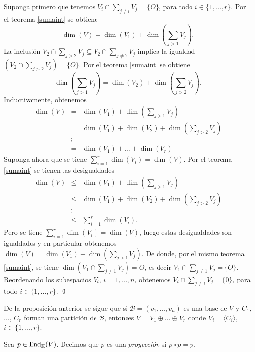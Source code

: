 \dem Suponga primero que tenemos $V_i\cap\sum_{j\ne i} V_j=\{O\}$, para todo $i\in\{1,\ldots,r\}$. Por el teorema \ref{sumaint} se obtiene
$$\dim(V)=\dim(V_1)+\dim\left(\sum_{j>1} V_j\right).$$
La inclusi\'on $V_2\cap\sum_{j>2} V_j\subseteq V_2\cap\sum_{j\ne 2} V_j$ implica la igualdad $\left(V_2\cap\sum_{j> 2} V_j\right)=\{O\}$. Por el teorema \ref{sumaint} se obtiene
$$\dim\left(\sum_{j>1} V_j\right)=\dim(V_2)+\dim\left(\sum_{j>2} V_j\right).$$
Inductivamente, obtenemos 
\begin{eqnarray*}
\dim(V) & = & \dim(V_1)+\dim\left(\sum_{j>1} V_j\right)\\
             & = & \dim(V_1)+\dim(V_2)+\dim\left(\sum_{j>2} V_j\right)\\
             & \vdots & \\
             & = & \dim(V_1)+\ldots+\dim(V_r)          
\end{eqnarray*}
Suponga ahora que se tiene $\sum_{i=1}^r \dim(V_i)=\dim(V)$. Por el teorema \ref{sumaint} se tienen las desigualdades
\begin{eqnarray*}
\dim(V) & \le & \dim(V_1)+\dim\left(\sum_{j>1} V_j\right)\\
             & \le & \dim(V_1)+\dim(V_2)+\dim\left(\sum_{j>2} V_j\right)\\
             & \vdots & \\
             & \le & \sum_{i=1}^r \dim(V_i).      
\end{eqnarray*}
Pero se tiene $\sum_{i=1}^r \dim(V_i)=\dim(V)$, luego estas desigualdades son igualdades y en particular obtenemos $\dim(V)=\dim(V_1)+\dim\left(\sum_{j>1} V_j\right)$. De donde, por el mismo teorema \ref{sumaint}, se tiene $\dim\left(V_1\cap\sum_{j\ne 1} V_j\right)=O$, es decir $V_1\cap\sum_{j\ne 1} V_j=\{O\}$. Reordenando los subespacios $V_i$, $i=1,\ldots,n$, obtenemos $V_i\cap\sum_{j\ne i} V_j=\{0\}$, para todo $i\in\{1,\ldots,r\}$. \qed

\begin{obs}\label{baseparticion}
  De la proposición anterior se sigue que si $\mathcal{B}=(v_1,\ldots,v_n)$ es una base de $V$ y $C_1$, $\ldots$, $C_r$ forman una partición de $\mathcal{B}$, entonces $V=V_1\oplus\ldots\oplus V_r$ donde $V_i=\langle C_i\rangle$, $i\in\{1,\ldots,r\}$.
\end{obs}

\begin{defn}
Sea $p\in\operatorname{End}_\mathbb{K}(V)$. Decimos que $p$ es una \emph{proyecci\'on} si $p\circ p=p$.
\end{defn}

